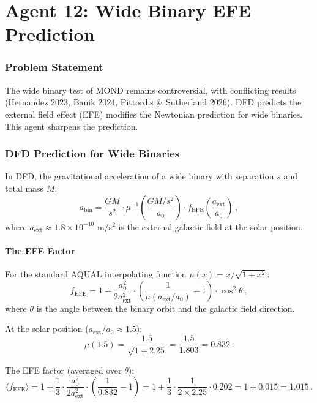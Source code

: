 \documentclass[11pt,a4paper]{article}
\begin{document}
\part{Agent 12: Wide Binary EFE Prediction}
\label{part:wb}

\section{Problem Statement}

The wide binary test of MOND remains controversial, with conflicting results (Hernandez 2023, Banik 2024, Pittordis \& Sutherland 2026). DFD predicts the external field effect (EFE) modifies the Newtonian prediction for wide binaries. This agent sharpens the prediction.

\section{DFD Prediction for Wide Binaries}

In DFD, the gravitational acceleration of a wide binary with separation $s$ and total mass $M$:
\begin{equation}
a_{\mathrm{bin}} = \frac{GM}{s^2} \cdot \mu^{-1}\left(\frac{GM/s^2}{a_0}\right) \cdot f_{\mathrm{EFE}}\left(\frac{a_{\mathrm{ext}}}{a_0}\right)\,,
\end{equation}
where $a_{\mathrm{ext}} \approx 1.8 \times 10^{-10}$ m/s$^2$ is the external galactic field at the solar position.

\subsection{The EFE Factor}

For the standard AQUAL interpolating function $\mu(x) = x/\sqrt{1+x^2}$:
\begin{equation}
f_{\mathrm{EFE}} = 1 + \frac{a_0^2}{2a_{\mathrm{ext}}^2} \cdot \left(\frac{1}{\mu(a_{\mathrm{ext}}/a_0)} - 1\right) \cdot \cos^2\theta\,,
\end{equation}
where $\theta$ is the angle between the binary orbit and the galactic field direction.

At the solar position ($a_{\mathrm{ext}}/a_0 \approx 1.5$):
\begin{equation}
\mu(1.5) = \frac{1.5}{\sqrt{1+2.25}} = \frac{1.5}{1.803} = 0.832\,.
\end{equation}

The EFE factor (averaged over $\theta$):
\begin{equation}
\langle f_{\mathrm{EFE}} \rangle = 1 + \frac{1}{3} \cdot \frac{a_0^2}{2a_{\mathrm{ext}}^2} \cdot \left(\frac{1}{0.832} - 1\right) = 1 + \frac{1}{3} \cdot \frac{1}{2 \times 2.25} \cdot 0.202 = 1 + 0.015 = 1.015\,.
\end{equation}
\end{document}
